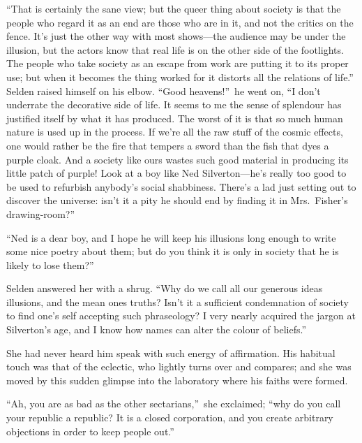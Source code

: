 \documentclass[12pt,a4paper]{book}
\begin{document}
``That is certainly the sane view; but the queer thing about
society is that the people who regard it as an end are those who
are in it, and not the critics on the fence. It's just the other
way with most shows---the audience may be under the illusion, but
the actors know that real life is on the other side of the
footlights. The people who take society as an escape from work
are putting it to its proper use; but when it becomes the thing
worked for it distorts all the relations of life.'' Selden raised
himself on his elbow. ``Good heavens!''\ he went on, ``I don't
underrate the decorative side of life. It seems to me the sense
of splendour has justified itself by what it has produced. The
worst of it is that so much human nature is used up in the
process. If we're all the raw stuff of the cosmic effects, one
would rather be the fire that tempers a sword than the fish that
dyes a purple cloak. And a society like ours wastes such good
material in producing its little patch of purple! Look at a boy
like Ned Silverton---he's really too good to be used to refurbish
anybody's social shabbiness. There's a lad just setting out to
discover the universe: isn't it a pity he should end by finding
it in Mrs.\ Fisher's drawing-room?''





``Ned is a dear boy, and I hope he will keep his illusions long
enough to write some nice poetry about them; but do you think it
is only in society that he is likely to lose them?''





Selden answered her with a shrug. ``Why do we call all our
generous ideas illusions, and the mean ones truths? Isn't it a
sufficient condemnation of society to find one's self accepting
such phraseology? I very nearly acquired the jargon at
Silverton's age, and I know how names can alter the colour of
beliefs.''





She had never heard him speak with such energy of affirmation. 
His habitual touch was that of the eclectic, who lightly turns
over and compares; and she was moved by this sudden glimpse into
the laboratory where his faiths were formed.





``Ah, you are as bad as the other sectarians,''\ she exclaimed; ``why
do you call your republic a republic? It is a closed corporation,
and you create arbitrary objections in order to keep people out.''
\end{document}

